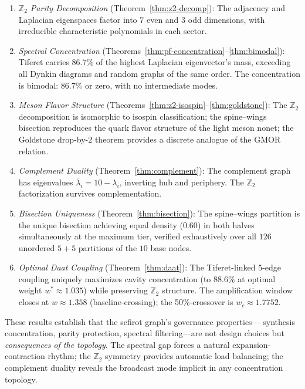 \documentclass[11pt,a4paper]{amsart}
\theoremstyle{remark}
\newcommand{\bbZ}{\mathbb{Z}}
\begin{document}
\begin{enumerate}[leftmargin=*,label=\arabic*.]
\item \emph{$\bbZ_2$ Parity Decomposition} (Theorem~\ref{thm:z2-decomp}):
  The adjacency and Laplacian eigenspaces factor into $7$ even and $3$ odd
  dimensions, with irreducible characteristic polynomials in each sector.

\item \emph{Spectral Concentration}
  (Theorems~\ref{thm:pf-concentration}--\ref{thm:bimodal}): Tiferet
  carries $86.7\%$ of the highest Laplacian eigenvector's mass, exceeding
  all Dynkin diagrams and random graphs of the same order. The
  concentration is bimodal: $86.7\%$ or zero, with no intermediate modes.

\item \emph{Meson Flavor Structure}
  (Theorems~\ref{thm:z2-isospin}--\ref{thm:goldstone}): The $\bbZ_2$
  decomposition is isomorphic to isospin classification; the spine--wings
  bisection reproduces the quark flavor structure of the light meson
  nonet; the Goldstone drop-by-$2$ theorem provides a discrete analogue
  of the GMOR relation.

\item \emph{Complement Duality} (Theorem~\ref{thm:complement}): The
  complement graph has eigenvalues $\bar{\lambda}_i = 10 - \lambda_i$,
  inverting hub and periphery. The $\bbZ_2$ factorization survives
  complementation.

\item \emph{Bisection Uniqueness} (Theorem~\ref{thm:bisection}): The
  spine--wings partition is the unique bisection achieving equal density
  ($0.60$) in both halves simultaneously at the maximum tier, verified
  exhaustively over all $126$ unordered $5+5$ partitions of the $10$ base
  nodes.

\item \emph{Optimal Daat Coupling} (Theorem~\ref{thm:daat}): The
  Tiferet-linked $5$-edge coupling uniquely maximizes cavity concentration
  (to $88.6\%$ at optimal weight $w^* \approx 1.035$) while preserving
  $\bbZ_2$ structure. The amplification window closes at $w \approx 1.358$
  (baseline-crossing); the 50\%-crossover is $w_c \approx 1.7752$.
\end{enumerate}

These results establish that the sefirot graph's governance properties---
synthesis concentration, parity protection, spectral filtering---are not
design choices but \emph{consequences of the topology}. The spectral gap
forces a natural expansion-contraction rhythm; the $\bbZ_2$ symmetry
provides automatic load balancing; the complement duality reveals the
broadcast mode implicit in any concentration topology.
\end{document}

